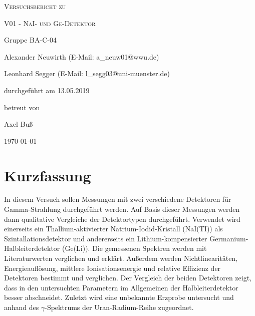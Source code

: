 \documentclass[
	a4paper,
	12pt,
	pagesize,
	ngerman
]{scrartcl}
\begin{document}
	\begin{titlepage}
		\centering
		{\scshape\LARGE Versuchsbericht zu \par}
		\vspace{1cm}
		{\scshape\huge V01 - NaI- und Ge-Detektor \par}
		\vspace{2.5cm}
		{\LARGE Gruppe BA-C-04 \par}
		\vspace{0.5cm}

		{\large Alexander Neuwirth (E-Mail: a\_neuw01@wwu.de) \par}
		{\large Leonhard Segger (E-Mail: l\_segg03@uni-muenster.de) \par}
		\vfill

		durchgeführt am 13.05.2019\par
		betreut von\par
		{\large Axel Buß}

		\vfill

		{\large \today\par}
	\end{titlepage}
	\tableofcontents
	\newpage

	\section{Kurzfassung}
	In diesem Versuch sollen Messungen mit zwei verschiedene Detektoren für Gamma-Strahlung durchgeführt werden.
	Auf Basis dieser Messungen werden dann qualitative Vergleiche der Detektortypen durchgeführt.
	Verwendet wird einerseits ein Thallium-aktivierter Natrium-Iodid-Kristall (NaI(TI)) als Szintallationsdetektor und andererseits ein Lithium-kompensierter Germanium-Halbleiterdetektor (Ge(Li)).
	Die gemessenen Spektren werden mit Literaturwerten verglichen und erklärt.
	Außerdem werden Nichtlinearitäten, Energieauflösung, mittlere Ionisationsenergie und relative Effizienz der Detektoren bestimmt und verglichen.
	Der Vergleich der beiden Detektoren zeigt, dass in den untersuchten Parametern im Allgemeinen der Halbleiterdetektor besser abschneidet.
	Zuletzt wird eine unbekannte Erzprobe untersucht und anhand des $\gamma$-Spektrums der Uran-Radium-Reihe zugeordnet.
\end{document}
